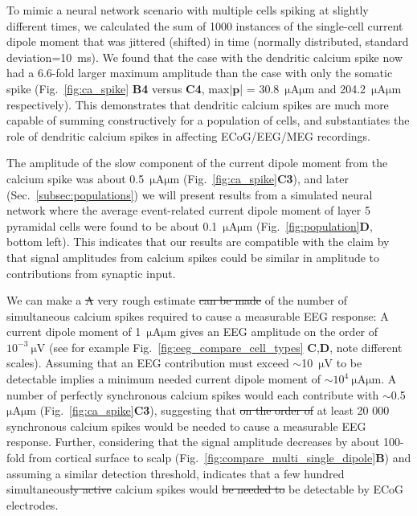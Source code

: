 \documentclass[preprint,10pt,authoryear]{elsarticle}
\newcommand{\hlg}[2][Emerald]{ {\sethlcolor{#1} \hl{#2}} }
\newcommand{\sntxt}[1]{{\color{NavyBlue}#1}}
\newcommand{\tvnnote}[1]{\color{white}{\hlg{TVN: #1 }}\color{black}}
\newcommand{\tvntxt}[1]{{\color{Emerald}#1}}
\begin{document}
To mimic a neural network scenario with multiple cells spiking at slightly different times, we calculated the sum of 1000 instances of the single-cell current dipole moment that was jittered (shifted) in time (normally distributed, standard deviation=10~ms).
We found that the case with the dendritic calcium spike now had a $6.6$-fold larger maximum amplitude than the case with
only the somatic spike (Fig.~\ref{fig:ca_spike} \textbf{B4} versus \textbf{C4}, 
$\mathrm{max}|\mathbf{p}$| = 30.8~$\si{\uA}\si{\um}$ and 204.2~$\si{\uA}\si{\um}$ respectively).
This demonstrates that dendritic calcium spikes are much more capable of summing constructively for a population of cells, and substantiates the role of dendritic calcium spikes in affecting ECoG/EEG/MEG recordings. 

The amplitude of the slow component of the current dipole moment from the calcium spike was about 0.5~$\si{\uA}\si{\um}$ (Fig.~\ref{fig:ca_spike}\textbf{C3}), and later (Sec.~\ref{subsec:populations}) we will present results from a simulated neural network where the average event-related current dipole moment of layer 5 pyramidal cells were found to be about 0.1~$\si{\uA}\si{\um}$ (Fig.~\ref{fig:population}{\bf D}, bottom left). This indicates that our results are compatible with the claim by \cite{SUZUKI2017} that signal amplitudes from calcium spikes could be similar in amplitude to contributions from synaptic input.

\tvntxt{
\sntxt{We can make a \sout{A}} very rough estimate \sntxt{\sout{can be made}} of the number of simultaneous calcium spikes required to cause a measurable EEG response: 
A current dipole moment of 1~$\si{\uA}\si{\um}$ gives an EEG amplitude on the order of $10^{-3}~\si{\uV}$ (see for example Fig.~\ref{fig:eeg_compare_cell_types} \textbf{C},\textbf{D}, note different scales).
Assuming that an EEG contribution must exceed $\sim$10~$\si{\uV}$ to be detectable \citep{NUNEZ2006, HAGEN2018} implies a minimum needed current dipole moment of $\sim10^4~\si{\uA}\si{\um}$. A number of perfectly synchronous calcium spikes would each contribute with $\sim$0.5~$\si{\uA}\si{\um}$ (Fig.~\ref{fig:ca_spike}\textbf{C3}), suggesting that \sntxt{\sout{on the order of}} at least 20 000 \sntxt{synchronous} calcium spikes would be needed to cause a measurable EEG response. Further, considering that the signal amplitude decreases by about 100-fold from cortical surface to scalp (Fig.~\ref{fig:compare_multi_single_dipole}\textbf{B}) and assuming a similar detection threshold, indicates that a few hundred simultaneous\sntxt{\sout{ly active}} calcium spikes would \sntxt{\sout{be needed to}} be detectable by ECoG electrodes.
}
\end{document}
